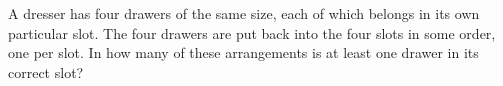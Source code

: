 A dresser has four drawers of the same size, each of which belongs in its own particular slot. The four drawers are put back into the four slots in some order, one per slot. In how many of these arrangements is at least one drawer in its correct slot?

